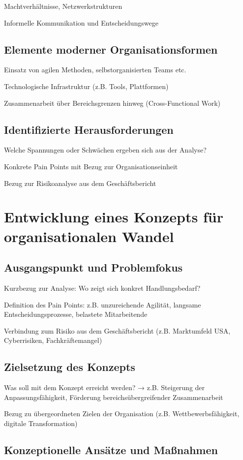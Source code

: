 \documentclass[12pt,a4paper]{article}
\begin{document}
	Machtverhältnisse, Netzwerkstrukturen
	
	Informelle Kommunikation und Entscheidungswege
	\subsection{Elemente moderner Organisationsformen}
	Einsatz von agilen Methoden, selbstorganisierten Teams etc.
	
	Technologische Infrastruktur (z.B. Tools, Plattformen)
	
	Zusammenarbeit über Bereichsgrenzen hinweg (Cross-Functional Work)
	\subsection{Identifizierte Herausforderungen}
	
	Welche Spannungen oder Schwächen ergeben sich aus der Analyse?
	
	Konkrete Pain Points mit Bezug zur Organisationseinheit
	
	Bezug zur Risikoanalyse aus dem Geschäftsbericht
	
	\section{Entwicklung eines Konzepts für organisationalen Wandel}
	\subsection{Ausgangspunkt und Problemfokus}
	
	Kurzbezug zur Analyse: Wo zeigt sich konkret Handlungsbedarf?
	
	Definition des Pain Points: z.B. unzureichende Agilität, langsame Entscheidungsprozesse, belastete Mitarbeitende
	
	Verbindung zum Risiko aus dem Geschäftsbericht (z.B. Marktumfeld USA, Cyberrisiken, Fachkräftemangel)
	
	\subsection{Zielsetzung des Konzepts}
	Was soll mit dem Konzept erreicht werden?
	→ z.B. Steigerung der Anpassungsfähigkeit, Förderung bereichsübergreifender Zusammenarbeit
	
	Bezug zu übergeordneten Zielen der Organisation (z.B. Wettbewerbsfähigkeit, digitale Transformation)
	\subsection{Konzeptionelle Ansätze und Maßnahmen}
	
\end{document}
